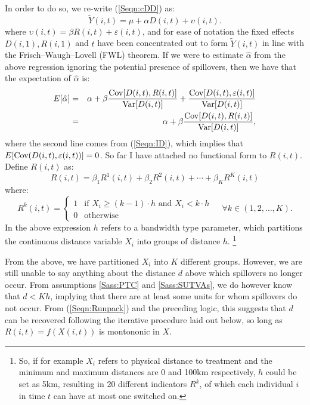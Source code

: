 In order to do so, we re-write (\ref{Seqn:cDD}) as:
\begin{equation}
\label{Seqn:cDDconc}
\tilde{Y}(i,t)=\mu + \alpha D(i,t) + \upsilon(i,t).
\end{equation}
where $\upsilon(i,t)=\beta R(i,t)+\varepsilon(i,t)$, and for ease of notation
the fixed effects $D(i,1), R(i,1)$ and $t$ have been concentrated out to form
$\tilde{Y}(i,t)$ in line with the  Frisch--Waugh--Lovell (FWL) theorem.  If we 
were to estimate $\hat\alpha$ from the above regression ignoring the potential 
presence of spillovers, then we have that the expectation of $\hat\alpha$ is:
\begin{eqnarray}
\label{Seqn:alphaExp}
E[\hat\alpha] &=& \alpha + \beta\frac{\mathrm{Cov}[D(i,t),R(i,t)]}{\mathrm{Var}[D(i,t)]}+\frac{\mathrm{Cov}[D(i,t),\varepsilon(i,t)]}{\mathrm{Var}[D(i,t)]} \nonumber \\ 
              &=& \alpha + \beta\frac{\mathrm{Cov}[D(i,t),R(i,t)]}{\mathrm{Var}[D(i,t)]},
\end{eqnarray}
where the second line comes from (\ref{Seqn:ID}), which implies that 
$E[\mathrm{Cov}(D(i,t),\varepsilon(i,t))]=0$.  So far I have attached no functional form 
to $R(i,t)$.  Define $R(i,t)$ as:
\begin{equation}
\label{Seqn:Runpack}
R(i,t) = \beta_1R^1(i,t)+\beta_2R^2(i,t)+ \cdots + \beta_KR^K(i,t)
\end{equation}  
where:
\begin{equation}
\label{Seqn:Rpar}
 R^k(i,t) =
  \begin{cases}
   1   & \text{if\ \ } X_i\geq(k-1)\cdot h \text{\ \ and \ } X_i<k\cdot h \\
   0   & \text{otherwise} 
  \end{cases}\ \ \ \ \ \forall k \in (1,2,\ldots,K).
\end{equation}
In the above expression $h$ refers to a bandwidth type parameter, which 
partitions the continuous distance variable $X_i$ into groups of distance $h$.%
\footnote{So, if for example $X_i$ refers to physical distance to treatment and 
the minimum and maximum distances are 0 and 100km respectively, $h$ could be set 
as 5km, resulting in 20 different indicators $R^k$, of which each individual $i$ 
in time $t$ can have at most one switched on.}

From the above, we have partitioned $X_i$ into $K$ different groups. However, we
are still unable to say anything about the distance $d$ above which spillovers no 
longer occur. From assumptions \ref{Sass:PTC} and \ref{Sass:SUTVAs}, we do 
however know that $d<Kh$, implying that there are at least some units for whom 
spillovers do not occur.  From (\ref{Seqn:Runpack}) and the preceding logic, this 
suggests that $d$ can be recovered following the iterative procedure laid out 
below, so long as $R(i,t)=f(X(i,t))$ is montononic in $X$.

